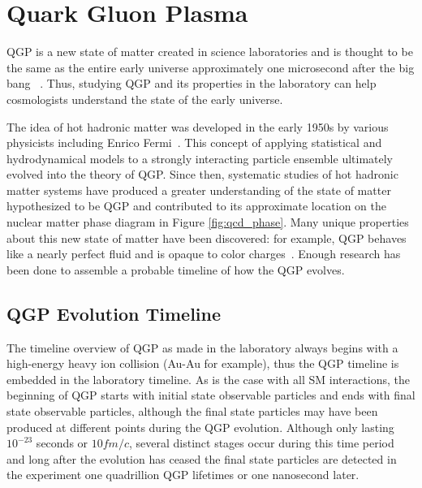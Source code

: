 \section{Quark Gluon Plasma}
QGP is a new state of matter created in science laboratories and is thought to be the same as the entire early universe approximately one microsecond after the big bang ~\cite{RAFELSKI2013155}. Thus, studying QGP and its properties in the laboratory can help cosmologists understand the state of the early universe.

The idea of hot hadronic matter was developed in the early 1950s by various physicists including Enrico Fermi~\cite{Fermi01071950}. This concept of applying statistical and hydrodynamical models to a strongly interacting particle ensemble ultimately evolved into the theory of QGP. Since then, systematic studies of hot hadronic matter systems have produced a greater understanding of the state of matter hypothesized to be QGP and contributed to its approximate location on the nuclear matter phase diagram in Figure \ref{fig:qcd_phase}. Many unique properties about this new state of matter have been discovered: for example, QGP behaves like a nearly perfect fluid and is opaque to color charges~\cite{Akiba:2015jwa}. Enough research has been done to assemble a probable timeline of how the QGP evolves.

\subsection{QGP Evolution Timeline}
The timeline overview of QGP as made in the laboratory always begins with a high-energy heavy ion collision (Au-Au for example), thus the QGP timeline is embedded in the laboratory timeline. As is the case with all SM interactions, the beginning of QGP starts with initial state observable particles and ends with final state observable particles, although the final state particles may have been produced at different points during the QGP evolution. Although only lasting $10^{-23}$ seconds or $10 fm/c$, several distinct stages occur during this time period and long after the evolution has ceased the final state particles are detected in the experiment one quadrillion QGP lifetimes or one nanosecond later.

